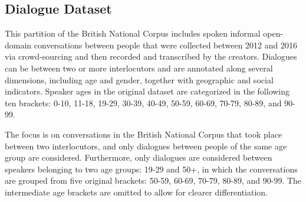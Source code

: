 \begin{table*}[h]
    \caption{Descriptive statistics of the datasets used in my experiments. {Length} is the number of tokens in a sample.}

    
    \label{tab:summary_corpora}
\end{table*}

\subsection{Dialogue Dataset}\label{sec:datadialogue}
\label{subsec:dialogue_dataset}


This partition of the British National Corpus includes spoken informal open-domain conversations between people that were collected between 2012 and 2016 via crowd-sourcing and then recorded and transcribed by the creators. Dialogues can be between two or more interlocutors and are annotated
along several dimensions, including age and gender, together with geographic and social indicators. Speaker ages in the original dataset are categorized in the following ten brackets: 0-10, 11-18, 19-29, 30-39, 40-49, 50-59, 60-69, 70-79, 80-89, and 90-99.


The focus is on conversations in the British National Corpus that took place between two interlocutors,
and only dialogues
between people of the same age group are considered. 
Furthermore, only dialogues are considered between speakers belonging to two age groups: 19-29 and 50+, in which the conversations are grouped from five original brackets: 50-59, 60-69, 70-79, 80-89, and 90-99.
The intermediate age brackets are omitted to allow for clearer differentiation.

